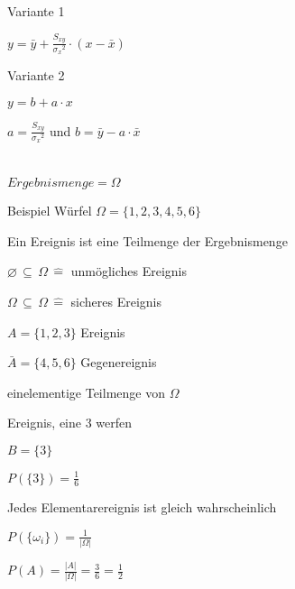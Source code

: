 \documentclass[10pt,a4paper,landscape]{article}
\begin{document}
\begin{multicols*}{4}
\subsection{}

\parbox{\columnwidth}{\centering Variante 1}
\parbox{\columnwidth}{\centering$y = \bar{y} + \frac{S_{xy}}{{\sigma_x}^2} \cdot (x-\bar{x})$}
\parbox{\columnwidth}{\centering Variante 2}
\parbox{\columnwidth}{\centering$y = b + a \cdot x$}
\parbox{\columnwidth}{\centering$a = \frac{S_{xy}}{{\sigma_x}^2}$ und $b = \bar{y} - a \cdot \bar{x}$}


\section{}
\subsection{}

\parbox{\columnwidth}{\centering$Ergebnismenge = \Omega$}
\parbox{\columnwidth}{\centering Beispiel Würfel $\Omega = \{ 1, 2, 3, 4, 5, 6 \}$}
\parbox{\columnwidth}{\centering Ein Ereignis ist eine Teilmenge der Ergebnismenge}
\parbox{\columnwidth}{\centering$\varnothing \, \subseteq \, \Omega \, \widehat{=}$ unmögliches Ereignis}
\parbox{\columnwidth}{\centering$\Omega \, \subseteq \, \Omega \, \widehat{=}$ sicheres Ereignis}
\parbox{\columnwidth}{\centering$A = \{1, 2, 3 \}$ Ereignis}
\parbox{\columnwidth}{\centering$\bar{A} = \{4, 5, 6 \}$ Gegenereignis}

\parbox{\columnwidth}{\centering einelementige Teilmenge von $\Omega$}
\parbox{\columnwidth}{\centering Ereignis, eine 3 werfen}
\parbox{\columnwidth}{\centering $B = \{ 3 \}$}
\parbox{\columnwidth}{\centering $P(\{3\}) = \frac{1}{6}$}

\parbox{\columnwidth}{\centering Jedes Elementarereignis ist gleich wahrscheinlich}
\parbox{\columnwidth}{\centering $P(\{\omega_i\}) = \frac{1}{\vert \Omega \vert}$}
\parbox{\columnwidth}{\centering $P(A) = \frac{\vert A \vert}{\vert \Omega \vert} = \frac{3}{6} = \frac{1}{2}$}


\end{multicols*}
\end{document}
